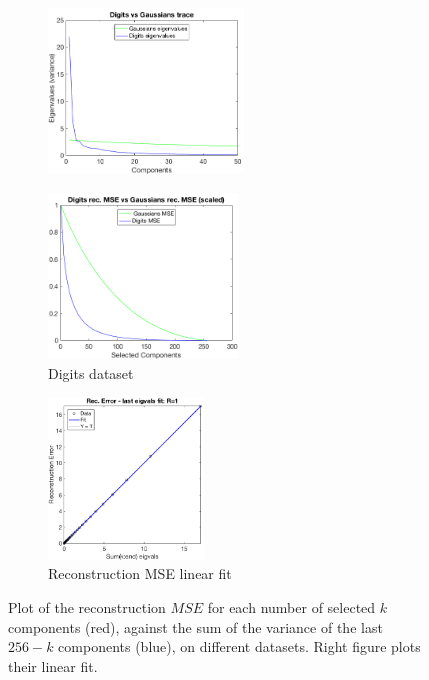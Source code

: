 \documentclass[a4paper, 10pt]{article}
\begin{document}
  \begin{figure}[h]
    \begin{adjustwidth}{-1cm}{-1cm}
    \centering
    \begin{subfigure}[t]{0.3\linewidth}
      \includegraphics[width=1\linewidth, height=4.4cm]{./lab3/PCA/digits_vs_random_trace.png}
      \label{fig:trace_compared}
    \end{subfigure}
    \begin{subfigure}[t]{0.29\linewidth}
      \includegraphics[width=1\linewidth, height=4.4cm]{./lab3/PCA/digits_vs_random_recMSE.png}
      \caption{Digits dataset}
      \label{fig:digits_rec}
    \end{subfigure}
    \begin{subfigure}[t]{0.3\linewidth}
      \includegraphics[width=1\linewidth, height=4.3cm]{./lab3/PCA/regression.png}
      \caption{Reconstruction MSE linear fit}
      \label{fig:regression}
    \end{subfigure}
    \end{adjustwidth}
    \caption{Plot of the reconstruction $MSE$ for each number of selected $k$ components (red),
    against the sum of the variance of the last $256-k$ components (blue), on 
  different datasets. Right figure plots their linear fit.}
    \label{fig:rec_vs_cumsum}
  \end{figure}
  
\end{document}
